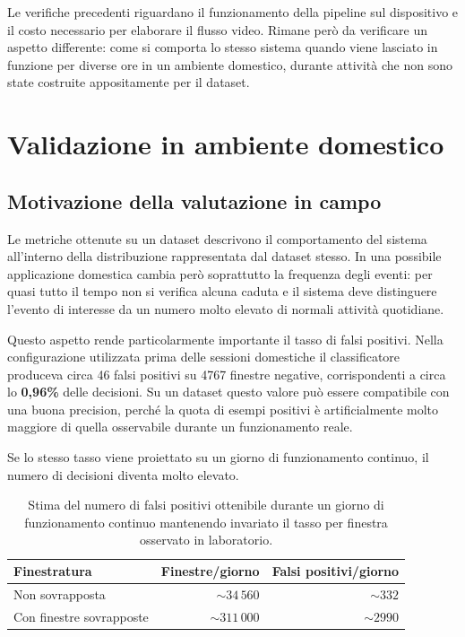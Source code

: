 Le verifiche precedenti riguardano il funzionamento della pipeline sul dispositivo e il costo necessario per elaborare il flusso video. Rimane però da verificare un aspetto differente: come si comporta lo stesso sistema quando viene lasciato in funzione per diverse ore in un ambiente domestico, durante attività che non sono state costruite appositamente per il dataset.

\section{Validazione in ambiente domestico}

\subsection{Motivazione della valutazione in campo}
\label{sec:perche-non-basta}

Le metriche ottenute su un dataset descrivono il comportamento del sistema all'interno della distribuzione rappresentata dal dataset stesso. In una possibile applicazione domestica cambia però soprattutto la frequenza degli eventi: per quasi tutto il tempo non si verifica alcuna caduta e il sistema deve distinguere l'evento di interesse da un numero molto elevato di normali attività quotidiane.

Questo aspetto rende particolarmente importante il tasso di falsi positivi. Nella configurazione utilizzata prima delle sessioni domestiche il classificatore produceva circa 46 falsi positivi su 4767 finestre negative, corrispondenti a circa lo \textbf{0,96\%} delle decisioni. Su un dataset questo valore può essere compatibile con una buona precision, perché la quota di esempi positivi è artificialmente molto maggiore di quella osservabile durante un funzionamento reale.

Se lo stesso tasso viene proiettato su un giorno di funzionamento continuo, il numero di decisioni diventa molto elevato.

\begin{table}[ht]
\centering
\caption{Stima del numero di falsi positivi ottenibile durante un giorno di
funzionamento continuo mantenendo invariato il tasso per finestra osservato in
laboratorio.}
\label{tab:finestratura}
\begin{tabular}{lrr}
\toprule
\textbf{Finestratura} & \textbf{Finestre/giorno} &
\textbf{Falsi positivi/giorno} \\
\midrule
Non sovrapposta & $\sim34\,560$ & $\sim332$ \\
Con finestre sovrapposte & $\sim311\,000$ & $\sim2990$ \\
\bottomrule
\end{tabular}
\end{table}

